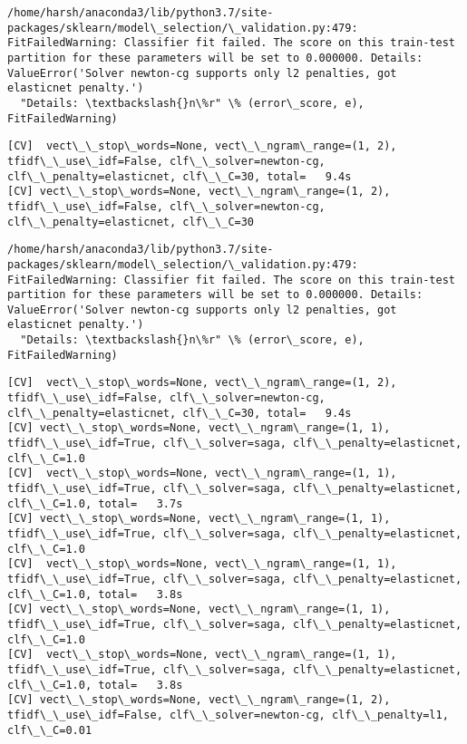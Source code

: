\documentclass[11pt]{article}
\begin{document}
    \begin{Verbatim}[commandchars=\\\{\}]
/home/harsh/anaconda3/lib/python3.7/site-packages/sklearn/model\_selection/\_validation.py:479: FitFailedWarning: Classifier fit failed. The score on this train-test partition for these parameters will be set to 0.000000. Details: 
ValueError('Solver newton-cg supports only l2 penalties, got elasticnet penalty.')
  "Details: \textbackslash{}n\%r" \% (error\_score, e), FitFailedWarning)

    \end{Verbatim}

    \begin{Verbatim}[commandchars=\\\{\}]
[CV]  vect\_\_stop\_words=None, vect\_\_ngram\_range=(1, 2), tfidf\_\_use\_idf=False, clf\_\_solver=newton-cg, clf\_\_penalty=elasticnet, clf\_\_C=30, total=   9.4s
[CV] vect\_\_stop\_words=None, vect\_\_ngram\_range=(1, 2), tfidf\_\_use\_idf=False, clf\_\_solver=newton-cg, clf\_\_penalty=elasticnet, clf\_\_C=30 

    \end{Verbatim}

    \begin{Verbatim}[commandchars=\\\{\}]
/home/harsh/anaconda3/lib/python3.7/site-packages/sklearn/model\_selection/\_validation.py:479: FitFailedWarning: Classifier fit failed. The score on this train-test partition for these parameters will be set to 0.000000. Details: 
ValueError('Solver newton-cg supports only l2 penalties, got elasticnet penalty.')
  "Details: \textbackslash{}n\%r" \% (error\_score, e), FitFailedWarning)

    \end{Verbatim}

    \begin{Verbatim}[commandchars=\\\{\}]
[CV]  vect\_\_stop\_words=None, vect\_\_ngram\_range=(1, 2), tfidf\_\_use\_idf=False, clf\_\_solver=newton-cg, clf\_\_penalty=elasticnet, clf\_\_C=30, total=   9.4s
[CV] vect\_\_stop\_words=None, vect\_\_ngram\_range=(1, 1), tfidf\_\_use\_idf=True, clf\_\_solver=saga, clf\_\_penalty=elasticnet, clf\_\_C=1.0 
[CV]  vect\_\_stop\_words=None, vect\_\_ngram\_range=(1, 1), tfidf\_\_use\_idf=True, clf\_\_solver=saga, clf\_\_penalty=elasticnet, clf\_\_C=1.0, total=   3.7s
[CV] vect\_\_stop\_words=None, vect\_\_ngram\_range=(1, 1), tfidf\_\_use\_idf=True, clf\_\_solver=saga, clf\_\_penalty=elasticnet, clf\_\_C=1.0 
[CV]  vect\_\_stop\_words=None, vect\_\_ngram\_range=(1, 1), tfidf\_\_use\_idf=True, clf\_\_solver=saga, clf\_\_penalty=elasticnet, clf\_\_C=1.0, total=   3.8s
[CV] vect\_\_stop\_words=None, vect\_\_ngram\_range=(1, 1), tfidf\_\_use\_idf=True, clf\_\_solver=saga, clf\_\_penalty=elasticnet, clf\_\_C=1.0 
[CV]  vect\_\_stop\_words=None, vect\_\_ngram\_range=(1, 1), tfidf\_\_use\_idf=True, clf\_\_solver=saga, clf\_\_penalty=elasticnet, clf\_\_C=1.0, total=   3.8s
[CV] vect\_\_stop\_words=None, vect\_\_ngram\_range=(1, 2), tfidf\_\_use\_idf=False, clf\_\_solver=newton-cg, clf\_\_penalty=l1, clf\_\_C=0.01 

    \end{Verbatim}
\end{document}
